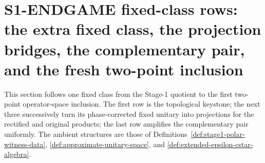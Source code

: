 \section{S1-ENDGAME fixed-class rows: the extra fixed class, the projection bridges, the complementary pair, and the fresh two-point inclusion}\label{sec:stage1-endgame-fixed-classes}

This section follows one fixed class from the Stage-1 quotient to the first two-point
operator-space inclusion.  The first row is the topological keystone; the next three
successively turn its phase-corrected fixed unitary into projections for the rectified and
original products; the last row amplifies the complementary pair uniformly.  The ambient
structures are those of Definitions~\ref{def:stage1-polar-witness-data},
\ref{def:approximate-unitary-space}, and \ref{def:extended-epsilon-cstar-algebra}.

